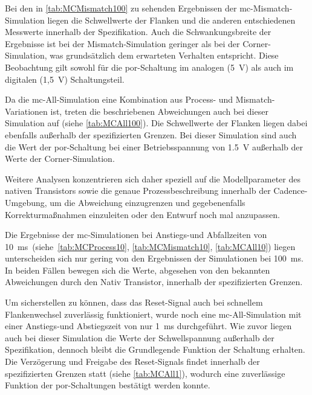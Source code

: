 Bei den in \autoref{tab:MCMismatch100} zu sehenden Ergebnissen der \gls{mc}-Mismatch-Simulation liegen die Schwellwerte der Flanken und die anderen entschiedenen Messwerte innerhalb der Spezifikation. Auch die Schwankungsbreite der Ergebnisse ist bei der Mismatch-Simulation geringer als bei der Corner-Simulation, was grundsätzlich dem erwarteten Verhalten entspricht. Diese Beobachtung gilt sowohl für die \gls{por}-Schaltung im analogen (5~V) als auch im digitalen (1,5~V) Schaltungsteil.


Da die \gls{mc}-All-Simulation eine Kombination aus Process- und Mismatch-Variatio\-nen ist, treten die beschriebenen Abweichungen auch bei dieser Simulation auf (siehe \autoref{tab:MCAll100}). Die Schwellwerte der Flanken liegen dabei ebenfalls außerhalb der spezifizierten Grenzen. Bei dieser Simulation sind auch die Wert der \gls{por}-Schaltung bei einer Betriebsspannung von 1.5~V außerhalb der Werte der Corner-Simulation. 


Weitere Analysen konzentrieren sich daher speziell auf die Modellparameter des nativen Transistors sowie die genaue Prozessbeschreibung innerhalb der Cadence-Umgebung, um die Abweichung einzugrenzen und gegebenenfalls Korrekturmaßnahmen einzuleiten oder den Entwurf noch mal anzupassen. 

Die Ergebnisse der \gls{mc}-Simulationen bei Anstiegs-und Abfallzeiten von 10~ms~(siehe~\ref{tab:MCProcess10}, \ref{tab:MCMismatch10}, \ref{tab:MCAll10}) liegen unterscheiden sich nur gering von den Ergebnissen der Simulationen bei 100~ms. In beiden Fällen bewegen sich die Werte, abgesehen von den bekannten Abweichungen durch den Nativ Transistor, innerhalb der spezifizierten Grenzen.  

Um sicherstellen zu können, dass das Reset-Signal auch bei schnellem Flankenwechsel zuverlässig funktioniert, wurde noch eine \gls{mc}-All-Simulation mit einer Anstiegs-und Abstiegszeit von nur 1~ms durchgeführt. Wie zuvor liegen auch bei dieser Simulation die Werte der Schwellspannung außerhalb der Spezifikation, dennoch bleibt die Grundlegende Funktion der Schaltung erhalten. Die Verzögerung und Freigabe des Reset-Signals findet innerhalb der spezifizierten Grenzen statt (siehe \ref{tab:MCAll1}), wodurch eine zuverlässige Funktion der \gls{por}-Schaltungen bestätigt werden konnte. 